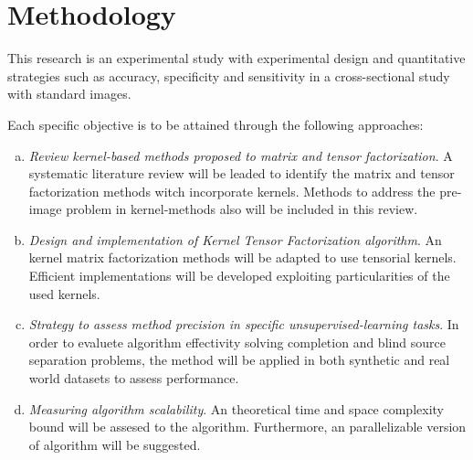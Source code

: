 \documentclass[letterpaper,12pt]{article}
\begin{document}
\section{Methodology}


This research is an experimental study with experimental design and quantitative strategies such as accuracy, specificity and sensitivity in a cross-sectional study with standard images.

Each specific objective is to be attained through the following approaches:

\begin{enumerate}[(a)]
 \item \textit{Review kernel-based methods proposed to matrix and tensor factorization}. A systematic literature review will be leaded to identify the matrix and tensor factorization methods witch incorporate kernels. Methods to address the pre-image problem in kernel-methods also will be included in this review.

\item \textit{Design and implementation of Kernel Tensor Factorization algorithm}. An kernel matrix factorization methods will be adapted to use tensorial kernels. Efficient implementations will be developed exploiting particularities of the used kernels. 
\item \textit{Strategy to assess method precision in specific unsupervised-learning tasks}. In order to evaluete algorithm effectivity solving completion and blind source separation problems, the method will be applied in both synthetic and real world datasets to assess performance.


\item \textit{Measuring algorithm scalability}. An theoretical time and space complexity bound will be assesed to the algorithm. Furthermore, an parallelizable version of algorithm will be suggested.
\end{enumerate}
\end{document}
